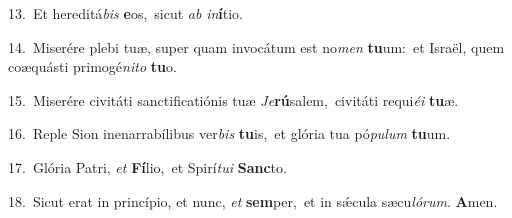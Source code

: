 {\numbfont\textcolor{\numbcolor}{13.}}~Et hereditá\textit{bis} \textbf{e}\-os,~\star sicut \textit{ab} \textit{in}\-\textbf{í}tio.\par
{\numbfont\textcolor{\numbcolor}{14.}}~Miserére plebi tuæ, super quam invocátum est no\textit{men} \textbf{tu}\-um:~\star et Israël, quem coæquásti primogé\-\textit{ni}\-\textit{to} \textbf{tu}\-o.\par
{\numbfont\textcolor{\numbcolor}{15.}}~Miserére civitáti sanctificatiónis tuæ \textit{Je}\-\textbf{rú}salem,~\star civitáti requi\-\textit{é}\-\textit{i} \textbf{tu}\-æ.\par
{\numbfont\textcolor{\numbcolor}{16.}}~Reple Sion inenarrabílibus ver\textit{bis} \textbf{tu}\-is,~\star et glória tua pó\-\textit{pu}\-\textit{lum} \textbf{tu}\-um.\par
{\numbfont\textcolor{\numbcolor}{17.}}~Glória Patri, \textit{et} \textbf{Fí}\-lio,~\star et Spirí\-\textit{tu}\-\textit{i} \textbf{Sanc}\-to.\par
{\numbfont\textcolor{\numbcolor}{18.}}~Sicut erat in princípio, et nunc, \textit{et} \textbf{sem}\-per,~\star et in sǽcula sæcu\-\textit{ló}\-\textit{rum}. \textbf{A}\-men.\par
